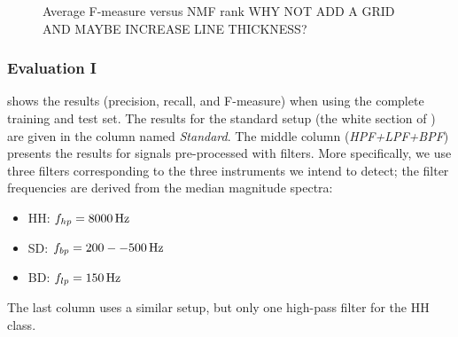 \documentclass{article}
\begin{document}
\begin{figure}
 \centerline{}
 \caption{Average F-measure versus NMF rank WHY NOT ADD A GRID AND MAYBE INCREASE LINE THICKNESS?}
 \label{fig:rankTest}
\end{figure}

\subsubsection{Evaluation I}
 shows the results (precision, recall, and F-measure) when using the complete training and test set. 
The results for the standard setup (the white section of ) are given in the column named \textit{Standard}. The middle column (\textit{HPF+LPF+BPF}) presents the results for signals pre-processed with filters. More specifically, we use three filters corresponding to the three instruments we intend to detect; the filter frequencies are derived from the median magnitude spectra: 
\begin{itemize}
    \item   HH: $f_{hp} = \unit[8000]{Hz}$
    \item   SD: $f_{bp} = \unit[200--500]{Hz}$
    \item   BD: $f_{lp} = \unit[150]{Hz}$
\end{itemize}
The last column uses a similar setup, but only one high-pass filter for the HH class.
\end{document}
